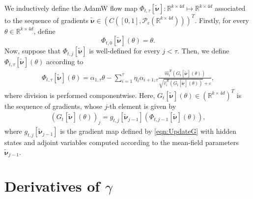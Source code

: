 \documentclass{article}
\newcommand{\R}{\mathbb{R}}
\begin{document}
\begin{appendices}
We inductively define the AdamW flow map $\Phi_{t,\tau}[\widetilde{\bm\nu}]:\R^{k\times 4d}\mapsto \R^{k\times 4d}$ associated to the sequence of gradients $\widetilde{\bm\nu}\in (C([0,1],\mathcal{P}_c(\R^{k\times 4d})))^T$. Firstly, for every $\theta\in\R^{k\times 4d}$, define 
\[
 \Phi_{t,0}[\widetilde{\bm\nu}](\theta)=\theta.
\]
Now, suppose that $\Phi_{t,j}[\widetilde{\bm\nu}]$ is well-defined for every $j <\tau$. Then, we define $\Phi_{t,\tau}[\widetilde{\bm\nu}](\theta)$ according to
\begin{align}\label{eqn:AdamWFlowMap}
\Phi_{t,\tau}[\widetilde{\bm\nu}](\theta)=\alpha_{1,\tau}\theta - \sum_{i=1}^\tau\eta_i\alpha_{i+1,\tau}\frac{\hat m^\mathcal{R}_i(G_t[\widetilde{\bm\nu}](\theta))}{\sqrt{\hat v^\mathcal {R}_i(G_{t}[\widetilde{\bm\nu}](\theta))}+\varepsilon},
\end{align}
where division is performed componentwise.
Here, $G_t[\widetilde{\bm\nu}](\theta)\in (\R^{k\times 4d})^T$ is the sequence of gradients, whose $j$-th element is given by
\begin{align}
    \left(G_t[\widetilde{\bm\nu}](\theta) \right)_j = g_{t,j}[\widetilde{\bm\nu}_{j-1}](\Phi_{t,j-1}[\widetilde{\bm\nu}](\theta)),
\end{align}
where $ g_{t,j}[\widetilde{\bm\nu}_{j-1}]$ is the gradient map defined by \eqref{eqn:UpdateG} with hidden states and adjoint variables computed according to the mean-field parameters $\widetilde{\bm\nu}_{j-1}$.

\section{Derivatives of $\gamma$}\label{App:C}


\end{appendices}
\end{document}
